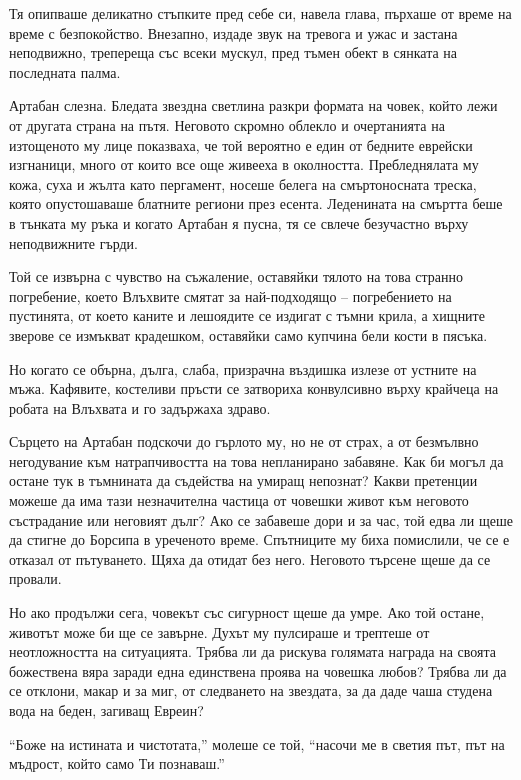 \documentclass[oneside,10pt]{memoir}
\begin{document}
Тя опипваше деликатно стъпките пред себе си, навела глава, пърхаше от време на
време с безпокойство. Внезапно, издаде звук на тревога и ужас и застана
неподвижно, трепереща със всеки мускул, пред тъмен обект в сянката на последната
палма.

Артабан слезна. Бледата звездна светлина разкри формата на човек, който лежи от
другата страна на пътя. Неговото скромно облекло и очертанията на изтощеното му
лице показваха, че той вероятно е един от бедните еврейски изгнаници, много от
които все още живееха в околността. Пребледнялата му кожа, суха и жълта като
пергамент, носеше белега на смъртоносната треска, която опустошаваше блатните
региони през есента. Леденината на смъртта беше в тънката му ръка и когато
Артабан я пусна, тя се свлече безучастно върху неподвижните гърди.

Той се извърна с чувство на съжаление, оставяйки тялото на това странно
погребение, което Влъхвите смятат за най-подходящо -- погребението на пустинята,
от което каните и лешоядите се издигат с тъмни крила, а хищните зверове се
измъкват крадешком, оставяйки само купчина бели кости в пясъка.

Но когато се обърна, дълга, слаба, призрачна въздишка излезе от устните на мъжа.
Кафявите, костеливи пръсти се затвориха конвулсивно върху крайчеца на робата на
Влъхвата и го задържаха здраво.

Сърцето на Артабан подскочи до гърлото му, но не от страх, а от безмълвно
негодувание към натрапчивостта на това непланирано забавяне. Как би могъл да
остане тук в тъмнината да съдейства на умиращ непознат? Какви претенции можеше
да има тази незначителна частица от човешки живот към неговото състрадание или
неговият дълг? Ако се забавеше дори и за час, той едва ли щеше да стигне до
Борсипа в уреченото време. Спътниците му биха помислили, че се е отказал от
пътуването. Щяха да отидат без него. Неговото търсене щеше да се провали.

Но ако продължи сега, човекът със сигурност щеше да умре. Ако той остане,
животът може би ще се завърне. Духът му пулсираше и трептеше от неотложността на
ситуацията. Трябва ли да рискува голямата награда на своята божествена вяра
заради една единствена проява на човешка любов? Трябва ли да се отклони, макар и
за миг, от следването на звездата, за да даде чаша студена вода на беден,
загиващ Евреин?

``Боже на истината и чистотата,'' молеше се той, ``насочи ме в светия път, път
на мъдрост, който само Ти познаваш.''
\end{document}

